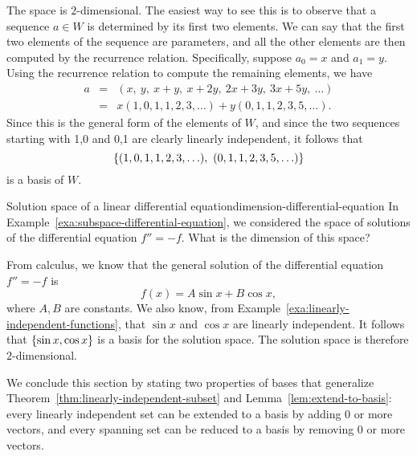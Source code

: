 \begin{solution}
  The space is $2$-dimensional. The easiest way to see this is to
  observe that a sequence $a\in W$ is determined by its first two
  elements. We can say that the first two elements of the sequence are
  parameters, and all the other elements are then computed by the
  recurrence relation. Specifically, suppose $a_0=x$ and
  $a_1=y$. Using the recurrence relation to compute the remaining
  elements, we have
  \begin{eqnarray*}
    a &=& (x,~y,~x+y,~x+2y,~2x+3y,~3x+5y,~\ldots) \\
      &=& x(1,0,1,1,2,3,\ldots) + y(0,1,1,2,3,5,\ldots).
  \end{eqnarray*}
  Since this is the general form of the elements of $W$, and since the
  two sequences starting with 1,0 and 0,1 are clearly linearly
  independent, it follows that
  \begin{equation*}
    \left\{(1,0,1,1,2,3,\ldots),~ (0,1,1,2,3,5,\ldots)\right\}
  \end{equation*}
  is a basis of $W$.
\end{solution}

\begin{example}{Solution space of a linear differential equation}{dimension-differential-equation}
  In Example~\ref{exa:subspace-differential-equation}, we considered
  the space of solutions of the differential equation $f''=-f$. What
  is the dimension of this space?
\end{example}

\begin{solution}
  From calculus, we know that the general solution of the differential
  equation $f''=-f$ is
  \begin{equation*}
    f(x) = A\sin x + B\cos x,
  \end{equation*}
  where $A,B$ are constants. We also know, from
  Example~\ref{exa:linearly-independent-functions}, that $\sin x$ and
  $\cos x$ are linearly independent. It follows that
  $\left\{\sin x, \cos x\right\}$ is a basis for the solution space. The
  solution space is therefore $2$-dimensional.
\end{solution}

We conclude this section by stating two properties of bases that
generalize Theorem~\ref{thm:linearly-independent-subset} and
Lemma~\ref{lem:extend-to-basis}: every linearly independent set can be
extended to a basis by adding 0 or more vectors, and every spanning
set can be reduced to a basis by removing 0 or more vectors.

